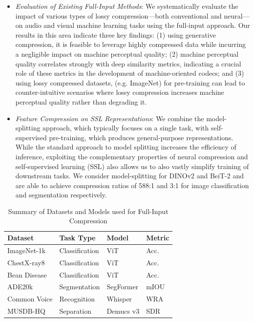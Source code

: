\documentclass[10pt,twocolumn,letterpaper]{article}
\begin{document}
\begin{itemize}
\item \textit{Evaluation of Existing Full-Input Methods}: We systematically evaluate the impact of various types of lossy compression---both conventional and neural---on audio and visual machine learning tasks using the full-input approach. Our results in this area indicate three key findings: (1) using generative compression, it is feasible to leverage highly compressed data while incurring a negligible impact on machine perceptual quality; (2) machine perceptual quality correlates strongly with deep similarity metrics, indicating a crucial role of these metrics in the development of machine-oriented codecs; and (3) using lossy compressed datasets, (e.g. ImageNet) for pre-training can lead to counter-intuitive scenarios where lossy compression increases machine perceptual quality rather than degrading it.
\item \textit{Feature Compression on SSL Representations}: We combine the model-splitting approach, which typically focuses on a single task, with self-supervised pre-training, which produces general-purpose representations. While the standard approach to model splitting increases the efficiency of inference, exploiting the complementary properties of neural compression and self-supervised learning (SSL) also allows us to also vastly simplify training of downstream tasks. We consider model-splitting for DINOv2 and BeiT-2 and are able to achieve compression ratios of 588:1 and 3:1 for image classification and segmentation respectively.
\end{itemize}
\begin{table}[ht]
\centering
\caption{Summary of Datasets and Models used for Full-Input Compression}
\label{tab:datasets_models}
\begin{tabular}{llll}
\toprule
Dataset & Task Type & Model & Metric \\
\midrule
ImageNet-1k & Classification & ViT &  Acc. \\
ChestX-ray8 & Classification & ViT & Acc. \\
Bean Disease & Classification & ViT & Acc. \\
ADE20k & Segmentation & SegFormer & mIOU \\
Common Voice & Recognition & Whisper & WRA \\
MUSDB-HQ & Separation & Demucs v3 & SDR \\
\bottomrule
\end{tabular}
\end{table}
\end{document}
